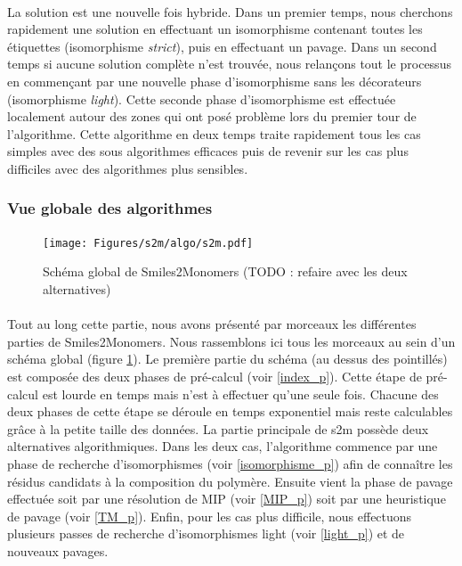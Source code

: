 \documentclass[12pt,french,twoside]{report}
\begin{document}
\paragraph{}La solution est une nouvelle fois hybride.
Dans un premier temps, nous cherchons rapidement une solution en effectuant un
isomorphisme contenant toutes les étiquettes (isomorphisme {\em strict}), puis en effectuant un pavage.
Dans un second temps si aucune solution complète n'est trouvée, nous relançons tout le processus en commençant par
une nouvelle phase d'isomorphisme sans les décorateurs (isomorphisme {\em light}).
Cette seconde phase d'isomorphisme est effectuée localement autour des zones qui ont posé problème lors du premier tour de 
l'algorithme.
Cette algorithme en deux temps traite rapidement tous les cas simples avec des sous algorithmes efficaces puis
de revenir sur les cas plus difficiles avec des algorithmes plus sensibles.

\subsubsection{Vue globale des algorithmes}

\begin{figure}
  \begin{center}
    \texttt{[image: Figures/s2m/algo/s2m.pdf]}
    \caption{\label{global_s2m}Schéma global de Smiles2Monomers (TODO : refaire avec les deux alternatives)}
  \end{center}
\end{figure}

\paragraph{}Tout au long cette partie, nous avons présenté par morceaux les différentes parties de Smiles2Monomers.
Nous rassemblons ici tous les morceaux au sein d'un schéma global (figure \ref{global_s2m}).
Le première partie du schéma (au dessus des pointillés) est composée des deux phases de pré-calcul (voir \ref{index_p}).
Cette étape de pré-calcul est lourde en temps mais n'est à effectuer qu'une seule fois.
Chacune des deux phases de cette étape se déroule en temps exponentiel mais reste calculables grâce à la petite taille des
données.
La partie principale de s2m possède deux alternatives algorithmiques.
Dans les deux cas, l'algorithme commence par une phase de recherche d'isomorphismes (voir \ref{isomorphisme_p}) afin de connaître les résidus candidats à la composition du polymère.
Ensuite vient la phase de pavage effectuée soit par une résolution de MIP (voir \ref{MIP_p}) soit par une heuristique de pavage (voir \ref{TM_p}).
Enfin, pour les cas plus difficile, nous effectuons plusieurs passes de recherche d'isomorphismes light (voir \ref{light_p}) et de nouveaux pavages.
\end{document}
